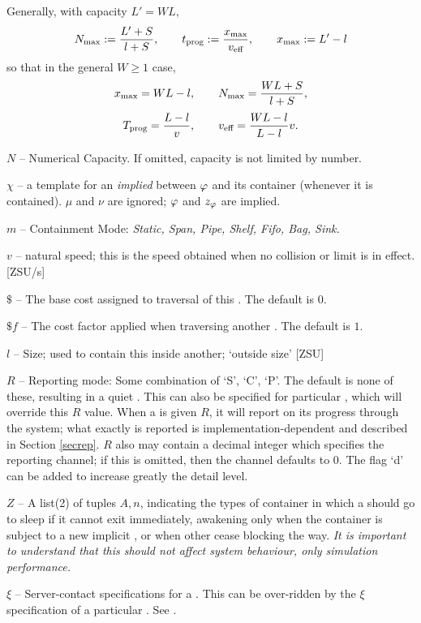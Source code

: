 \begin{itemize}
    Generally, with capacity $L' = WL$,
    \[
    N_\textup{max}:=\frac{L'+S}{l+S},\qquad
    t_{\textup{prog}} := \frac{x_\textup{max}}{v_\textup{eff}},\qquad
    x_\textup{max} := L' - l
    \]
    so that in the general $W \ge 1$ case,
    \[x_\textup{max} = WL-l,\qquad
    N_\textup{max} = \frac{WL+S}{l+S},
    \]
    \[
    T_\textup{prog} = \frac{L-l}{v},\qquad
    v_\textup{eff} = \frac{WL-l}{L-l}v.
    \]

    $N$ -- Numerical Capacity. If omitted, capacity is not limited by number.

    $\chi$ -- a  template for an \emph{implied}
     between ${\varphi}$ and its container (whenever it is contained).
    $\mu$ and $\nu$ are ignored; ${\varphi}$ and ${z}_\varphi$ are implied.
    
    $m$ -- Containment Mode: \emph{Static, Span, Pipe, Shelf, Fifo, Bag, Sink.}
    
    $v$ -- natural speed; this is the speed obtained when no collision or limit is in effect. [ZSU/s]

    $\$$ -- The base cost assigned to traversal of this . The default is $0$.

    $\$f$ -- The cost factor applied when traversing another . The default is $1$.
    
    $l$ --  Size; used to contain this  inside another; `outside size' [ZSU]

    $R$ -- Reporting mode: Some combination of `S', `C', `P'.  The default
    is none of these, resulting in a quiet .  This can also
    be specified for particular , which will override
    this $R$ value.  When a  is given $R$, it
    will report on its progress through the system; what exactly is
    reported is implementation-dependent and described in Section
    \ref{secrep}. $R$ also may contain a decimal integer which specifies
    the reporting channel; if this is omitted, then the channel
    defaults to $0$. The flag `d' can be added to increase greatly the detail level.
    
    $Z$ -- A list(2) of tuples $A,n$, indicating the types of
    container in which a  should go to sleep if it cannot
    exit immediately, awakening only when the container is subject to
    a new implicit , or when other  cease
    blocking the way.  \emph{It is important to understand that this
    should not affect system behaviour, only simulation performance.}

    $\xi$ -- Server-contact specifications for a .
    This can be over-ridden by the $\xi$ specification of a particular .
    See .
    
\end{itemize}

